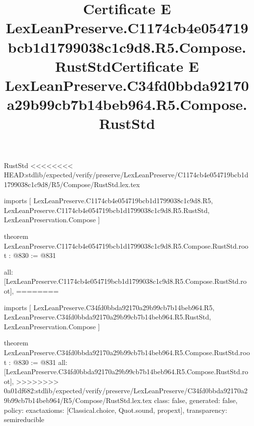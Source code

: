 \begin{lexlean}{RustStd}
<<<<<<<< HEAD:stdlib/expected/verify/preserve/LexLeanPreserve/C1174cb4e054719bcb1d1799038c1c9d8/R5/Compose/RustStd.lex.tex
\title{Certificate E LexLeanPreserve.C1174cb4e054719bcb1d1799038c1c9d8.R5.Compose.RustStd}
\begin{coremodule}
imports [
  LexLeanPreserve.C1174cb4e054719bcb1d1799038c1c9d8.R5,
  LexLeanPreserve.C1174cb4e054719bcb1d1799038c1c9d8.R5.RustStd,
  LexLeanPreservation.Compose
]

theorem LexLeanPreserve.C1174cb4e054719bcb1d1799038c1c9d8.R5.Compose.RustStd.root : @830 := @831 {
  all: [LexLeanPreserve.C1174cb4e054719bcb1d1799038c1c9d8.R5.Compose.RustStd.root],
========
\title{Certificate E LexLeanPreserve.C34fd0bbda92170a29b99cb7b14beb964.R5.Compose.RustStd}
\begin{coremodule}
imports [
  LexLeanPreserve.C34fd0bbda92170a29b99cb7b14beb964.R5,
  LexLeanPreserve.C34fd0bbda92170a29b99cb7b14beb964.R5.RustStd,
  LexLeanPreservation.Compose
]

theorem LexLeanPreserve.C34fd0bbda92170a29b99cb7b14beb964.R5.Compose.RustStd.root : @830 := @831 {
  all: [LexLeanPreserve.C34fd0bbda92170a29b99cb7b14beb964.R5.Compose.RustStd.root],
>>>>>>>> 0a01df682:stdlib/expected/verify/preserve/LexLeanPreserve/C34fd0bbda92170a29b99cb7b14beb964/R5/Compose/RustStd.lex.tex
  class: false,
  generated: false,
  policy: exact{axioms: [Classical.choice, Quot.sound, propext]},
  transparency: semireducible
}


\end{coremodule}}
\end{coremodule}
\end{lexlean}
